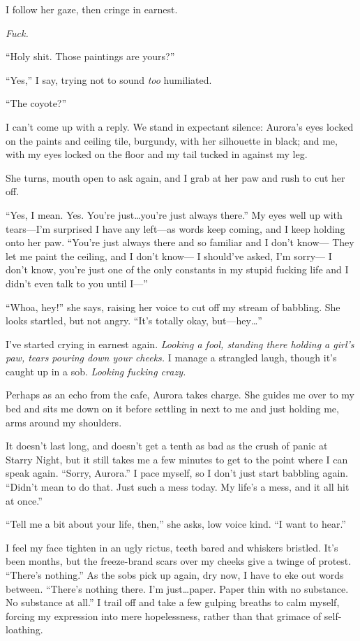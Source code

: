 I follow her gaze, then cringe in earnest.

\emph{Fuck.}

``Holy shit. Those paintings are yours?''

``Yes,'' I say, trying not to sound \emph{too} humiliated.

``The coyote?''

I can't come up with a reply. We stand in expectant silence: Aurora's eyes locked on the paints and ceiling tile, burgundy, with her silhouette in black; and me, with my eyes locked on the floor and my tail tucked in against my leg.

She turns, mouth open to ask again, and I grab at her paw and rush to cut her off.

``Yes, I mean. Yes. You're just\ldots{}you're just always there.'' My eyes well up with tears---I'm surprised I have any left---as words keep coming, and I keep holding onto her paw. ``You're just always there and so familiar and I don't know--- They let me paint the ceiling, and I don't know--- I should've asked, I'm sorry--- I don't know, you're just one of the only constants in my stupid fucking life and I didn't even talk to you until I---''

``Whoa, hey!'' she says, raising her voice to cut off my stream of babbling. She looks startled, but not angry. ``It's totally okay, but---hey\ldots{}''

I've started crying in earnest again. \emph{Looking a fool, standing there holding a girl's paw, tears pouring down your cheeks.} I manage a strangled laugh, though it's caught up in a sob. \emph{Looking fucking crazy.}

Perhaps as an echo from the cafe, Aurora takes charge. She guides me over to my bed and sits me down on it before settling in next to me and just holding me, arms around my shoulders.

It doesn't last long, and doesn't get a tenth as bad as the crush of panic at Starry Night, but it still takes me a few minutes to get to the point where I can speak again. ``Sorry, Aurora.'' I pace myself, so I don't just start babbling again. ``Didn't mean to do that. Just such a mess today. My life's a mess, and it all hit at once.''

``Tell me a bit about your life, then,'' she asks, low voice kind. ``I want to hear.''

I feel my face tighten in an ugly rictus, teeth bared and whiskers bristled. It's been months, but the freeze-brand scars over my cheeks give a twinge of protest. ``There's nothing.'' As the sobs pick up again, dry now, I have to eke out words between. ``There's nothing there. I'm just\ldots{}paper. Paper thin with no substance. No substance at all.'' I trail off and take a few gulping breaths to calm myself, forcing my expression into mere hopelessness, rather than that grimace of self-loathing.

